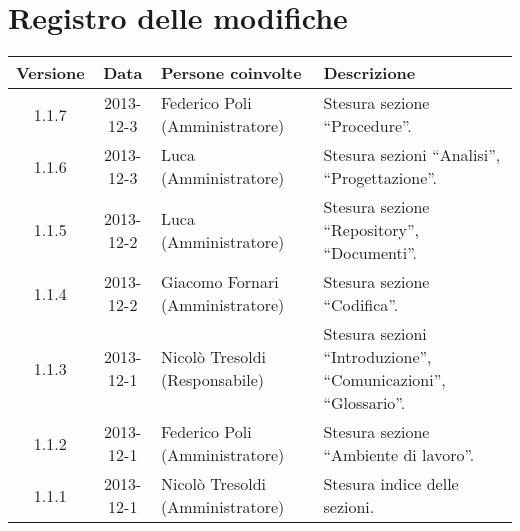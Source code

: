 \section*{Registro delle modifiche}

\small{
\begin{tabularx}{\textwidth}{|c|c|l|X|}
 \hline \textbf{Versione} & \textbf{Data} & \textbf{Persone coinvolte} & \textbf{Descrizione} \\

 
 \hline 1.1.7 & 2013-12-3 & Federico Poli (Amministratore) &
 Stesura sezione ``Procedure''. \\

 \hline 1.1.6 & 2013-12-3 & Luca (Amministratore) &
 Stesura sezioni ``Analisi'', ``Progettazione''. \\

 \hline 1.1.5 & 2013-12-2 & Luca (Amministratore) &
 Stesura sezione ``Repository'', ``Documenti''. \\

 \hline 1.1.4 & 2013-12-2 & Giacomo Fornari (Amministratore) &
 Stesura sezione ``Codifica''. \\

 \hline 1.1.3 & 2013-12-1 & Nicolò Tresoldi (Responsabile) &
 Stesura sezioni ``Introduzione'', ``Comunicazioni'', ``Glossario''. \\

 \hline 1.1.2 & 2013-12-1 & Federico Poli (Amministratore) &
 Stesura sezione ``Ambiente di lavoro''. \\

 \hline 1.1.1 & 2013-12-1 & Nicolò Tresoldi (Amministratore) &
 Stesura indice delle sezioni. \\

 \hline
\end{tabularx}
}
